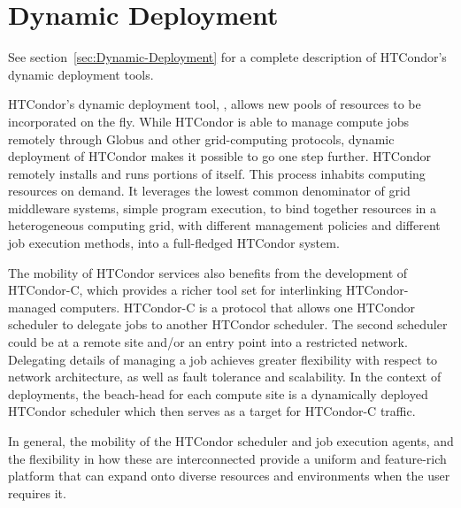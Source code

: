 \section{\label{sec:Deployment}Dynamic Deployment}

See section~\ref{sec:Dynamic-Deployment}
for a complete description of HTCondor's dynamic deployment tools.

HTCondor's dynamic deployment tool,
,
allows new pools of resources to be  incorporated on the fly.
While HTCondor is able to manage compute jobs remotely 
through Globus and other grid-computing protocols,
dynamic deployment of HTCondor makes it possible to go one step further.
HTCondor remotely installs and runs portions of itself.
This process inhabits computing resources
on demand.  
It leverages the lowest common denominator of grid middleware systems,
simple program  execution,
to bind together resources in a heterogeneous computing grid,
with different management policies and different job execution methods,
into a full-fledged HTCondor system. 

The mobility of HTCondor services also benefits from
the development  of HTCondor-C,
which provides a richer tool set for interlinking HTCondor-managed computers.
HTCondor-C is a protocol that allows one HTCondor scheduler
to delegate jobs to another HTCondor scheduler.
The second scheduler could be at a remote site and/or an entry point
into a restricted network.
Delegating details of managing a job
achieves greater flexibility with respect to network architecture,
as well as fault tolerance and scalability.
In the  context of deployments,
the beach-head for each compute site is a dynamically deployed
HTCondor scheduler which then serves as a target for HTCondor-C traffic.

In general,
the mobility of the HTCondor scheduler and job execution agents,
and the flexibility in how these are interconnected
provide a uniform and feature-rich platform
that can expand onto diverse resources and environments
when the user requires it.


